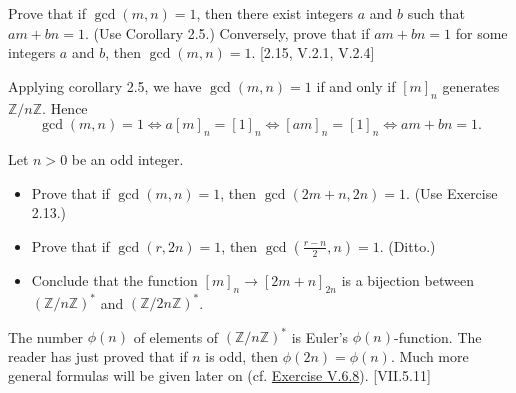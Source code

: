 \documentclass[12pt,letterpaper,boxed]{hmcpset}
\begin{document}
\begin{problem}[2.13]	
	Prove that if $\gcd(m, n) = 1$, then there exist integers $a$ and $b$ such that $am + bn = 1$. (Use Corollary 2.5.) Conversely, prove that if $am+ bn = 1$ for some integers $a$ and $b$, then $\gcd(m, n) = 1$. [2.15, \textsection V.2.1, V.2.4]
\end{problem}
\begin{solution}
	Applying corollary 2.5, we have $\gcd(m, n) = 1$ if and only if $[m]_n$ generates $\mathbb{Z}/n\mathbb{Z}$. Hence
	\[
	\gcd(m, n) = 1\iff a[m]_n=[1]_n\iff [am]_n=[1]_n\iff am+ bn = 1.
	\]
\end{solution}
    


\begin{problem}[2.15]	
	Let $n > 0$ be an odd integer.
	\begin{itemize}
		\item Prove that if $\gcd(m, n) = 1$, then $\gcd(2m+ n, 2n) = 1$. (Use Exercise 2.13.)
		\item Prove that if $\gcd(r, 2n) = 1$, then $\gcd(\frac{r-n}{2}, n) = 1$. (Ditto.)		
		\item Conclude that the function $[m]_n\rightarrow[2m + n]_{2n}$ is a bijection between $(\mathbb{Z}/n\mathbb{Z})^*$ and $(\mathbb{Z}/2n\mathbb{Z})^*$. 
	\end{itemize}
	The number $\phi(n)$ of elements of $(\mathbb{Z}/n\mathbb{Z})^*$ is Euler’s $\phi(n)$-function. The reader has just	proved that if $n$ is odd, then $\phi(2n) = \phi(n)$. Much more general formulas will be given later on (cf. \hyperlink{Exercise V.6.8}{Exercise V.6.8}). [VII.5.11]
\end{problem}
\end{document}
